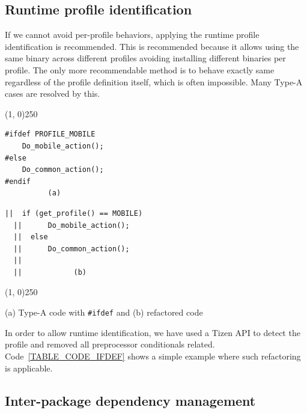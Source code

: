 \subsection{Runtime profile identification}\label{SS_RUntimeProfileId}

If we cannot avoid per-profile behaviors, applying the runtime profile identification is recommended.
This is recommended because it allows using the same binary across different profiles avoiding installing different binaries per profile.
The only more recommendable method is to behave exactly same regardless of the profile definition itself, which is often impossible.
Many Type-A cases are resolved by this.

\renewcommand{\tablename}{Code}
\begin{table}

\begin{center}
\line(1, 0){250}
\end{center}
\vspace{-0.1cm}

\hspace{0.5cm}\begin{BVerbatim}[baseline=c]
#ifdef PROFILE_MOBILE
    Do_mobile_action();
#else
    Do_common_action();
#endif
          (a)
\end{BVerbatim}
\begin{BVerbatim}[baseline=c]
  ||  if (get_profile() == MOBILE)
  ||      Do_mobile_action();
  ||  else
  ||      Do_common_action();
  ||       
  ||            (b)
\end{BVerbatim}

\vspace{-0.1cm}
\begin{center}
\line(1, 0){250}
\end{center}
\vspace{-0.2cm}

\captionsetup{labelformat=simple,labelsep=period}
\caption{(a) Type-A code with \texttt{\#ifdef} and (b) refactored code}\label{TABLE_CODE_IFDEF}
\end{table}

In order to allow runtime identification, we have used a Tizen API to detect the profile and removed all preprocessor conditionals related. Code~\ref{TABLE_CODE_IFDEF} shows a simple example where such refactoring is applicable.

\subsection{Inter-package dependency management}\label{SS_interpkg_dep_mgt}

